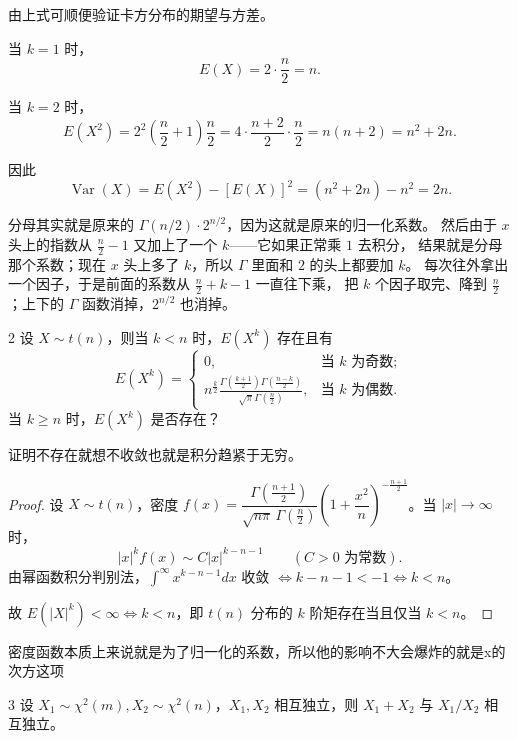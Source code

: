 \begin{remark}
由上式可顺便验证卡方分布的期望与方差。

当 \(k=1\) 时，
\[
E(X)=2\cdot \frac n2=n.
\]

当 \(k=2\) 时，
\[
E(X^2)=2^2\left(\frac n2+1\right)\frac n2
=4\cdot \frac{n+2}{2}\cdot \frac n2
=n(n+2)=n^2+2n.
\]

因此
\[
\operatorname{Var}(X)=E(X^2)-[E(X)]^2=(n^2+2n)-n^2=2n.
\]
\end{remark}
\begin{dxtips}
 分母其实就是原来的 $\Gamma(n/2)\cdot 2^{n/2}$，因为这就是原来的归一化系数。
然后由于 $x$ 头上的指数从 $\frac{n}{2}-1$ 又加上了一个 $k$——它如果正常乘 $1$ 去积分，
结果就是分母那个系数；现在 $x$ 头上多了 $k$，所以 $\Gamma$ 里面和 $2$ 的头上都要加 $k$。
每次往外拿出一个因子，于是前面的系数从 $\frac{n}{2}+k-1$ 一直往下乘，
把 $k$ 个因子取完、降到 $\frac{n}{2}$；上下的 $\Gamma$ 函数消掉，$2^{n/2}$ 也消掉。
\end{dxtips}
\begin{homework}{2}
设 $X \sim t(n)$，则当 $k < n$ 时，$E(X^k)$ 存在且有
$$E(X^k) = 
\begin{cases} 
0, & \text{当 } k \text{ 为奇数}; \\ 
n^{\frac{k}{2}} \frac{\Gamma\left(\frac{k+1}{2}\right)\Gamma\left(\frac{n-k}{2}\right)}{\sqrt{\pi}\Gamma\left(\frac{n}{2}\right)}, & \text{当 } k \text{ 为偶数}. 
\end{cases}$$
当 $k \geqslant n$ 时，$E(X^k)$ 是否存在？
\end{homework}
\begin{dxtips}
    证明不存在就想不收敛也就是积分趋紧于无穷。
\end{dxtips}
\begin{proof}
设 \(X\sim t(n)\)，密度 \(f(x)=\dfrac{\Gamma(\frac{n+1}{2})}{\sqrt{n\pi}\,\Gamma(\frac n2)}\left(1+\dfrac{x^2}{n}\right)^{-\frac{n+1}{2}}\)。当 \(|x|\to\infty\) 时，
\[
|x|^kf(x)\sim C|x|^{k-n-1}\qquad(C>0\text{ 为常数}).
\]
由幂函数积分判别法，\(\displaystyle\int^{\infty} x^{k-n-1}dx\) 收敛 \(\iff k-n-1<-1\iff k<n\)。

故 \(E(|X|^k)<\infty\iff k<n\)，即 \(t(n)\) 分布的 \(k\) 阶矩存在当且仅当 \(k<n\)。
\end{proof}
\begin{dxtips}
    密度函数本质上来说就是为了归一化的系数，所以他的影响不大会爆炸的就是x的次方这项
\end{dxtips}
\begin{homework}{3}
设 $X_1 \sim \chi^2(m), X_2 \sim \chi^2(n)$，$X_1, X_2$ 相互独立，则 $X_1 + X_2$ 与 $X_1/X_2$ 相互独立。
\end{homework}
